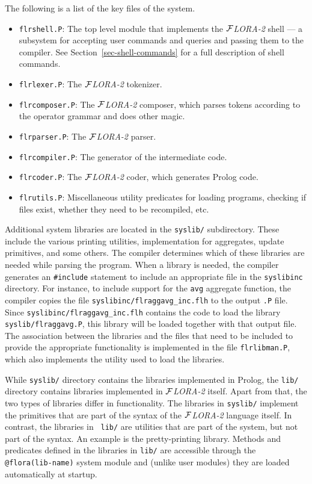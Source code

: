 \documentclass[11pt]{article}
\newcommand{\FLORA}{{\mbox{${\cal F}${\small\it LORA}\rm\emph{-2}}}\xspace}
\begin{document}
The following is a list of the key files of the system.
\begin{itemize}
\item \texttt{flrshell.P}: The top level module that implements the
  \FLORA shell --- a subsystem for accepting user commands and queries and
  passing them to the compiler.  See Section~\ref{sec-shell-commands} for a
  full description of shell commands.
\item \texttt{flrlexer.P}: The \FLORA tokenizer.
\item \texttt{flrcomposer.P}: The \FLORA composer, which parses tokens
  according to the operator grammar and does other magic.
\item \texttt{flrparser.P}: The \FLORA parser.
\item \texttt{flrcompiler.P}: The generator of the intermediate code.
\item \texttt{flrcoder.P}: The \FLORA coder, which generates Prolog code.
\item \texttt{flrutils.P}: Miscellaneous utility predicates for loading
  programs, checking if files exist, whether they need to be recompiled,
  etc.
\end{itemize}
Additional system libraries are located in the {\tt syslib/} subdirectory.
These include the various printing utilities, implementation for
aggregates, update primitives, and some others. The compiler determines
which of these libraries are needed while parsing the program. When a
library is needed, the compiler generates an {\tt \#include} statement to
include an appropriate file in the {\tt syslibinc} directory. For instance,
to include support for the {\tt avg} aggregate function, the compiler
copies the file {\tt syslibinc/flraggavg\_inc.flh} to the output {\tt .P}
file.  Since {\tt syslibinc/flraggavg\_inc.flh} contains the code to load
the library {\tt syslib/flraggavg.P}, this library will be loaded together
with that output file. The association between the libraries and the files
that need to be included to provide the appropriate functionality is
implemented in the file {\tt flrlibman.P}, which also implements the
utility used to load the libraries.

While {\tt syslib/} directory contains the libraries implemented in Prolog,
the {\tt lib/} directory contains libraries implemented in \FLORA itself.
Apart from that, the two types of libraries differ in functionality.  The
libraries in {\tt syslib/} implement the primitives that are part of the
syntax of the \FLORA language itself. In contrast, the libraries in {\tt
  lib/} are utilities that are part of the system, but not part of the
syntax. An example is the pretty-printing library.  Methods and predicates
defined in the libraries in {\tt lib/} are accessible through the {\tt
  @flora(lib-name)} system module and (unlike user modules) they are loaded
automatically at startup.
\end{document}
